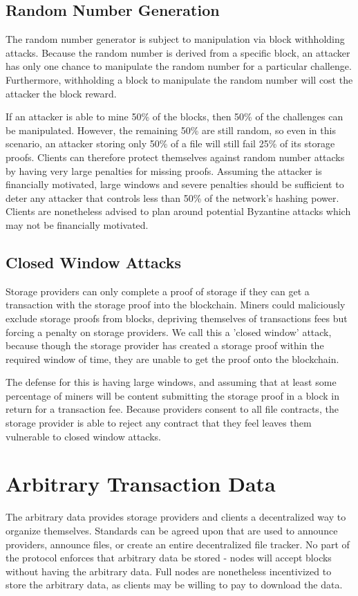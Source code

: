 \documentclass[twocolumn]{article}
\begin{document}
\subsection{Random Number Generation}
The random number generator is subject to manipulation via block withholding attacks.
Because the random number is derived from a specific block, an attacker has only one chance to manipulate the random number for a particular challenge.
Furthermore, withholding a block to manipulate the random number will cost the attacker the block reward.

If an attacker is able to mine 50\% of the blocks, then 50\% of the challenges can be manipulated.
However, the remaining 50\% are still random, so even in this scenario, an attacker storing only 50\% of a file will still fail 25\% of its storage proofs.
Clients can therefore protect themselves against random number attacks by having very large penalties for missing proofs.
Assuming the attacker is financially motivated, large windows and severe penalties should be sufficient to deter any attacker that controls less than 50\% of the network's hashing power.
Clients are nonetheless advised to plan around potential Byzantine attacks which may not be financially motivated.

\subsection{Closed Window Attacks}
Storage providers can only complete a proof of storage if they can get a transaction with the storage proof into the blockchain.
Miners could maliciously exclude storage proofs from blocks, depriving themselves of transactions fees but forcing a penalty on storage providers.
We call this a 'closed window' attack, because though the storage provider has created a storage proof within the required window of time, they are unable to get the proof onto the blockchain.

The defense for this is having large windows, and assuming that at least some percentage of miners will be content submitting the storage proof in a block in return for a transaction fee.
Because providers consent to all file contracts, the storage provider is able to reject any contract that they feel leaves them vulnerable to closed window attacks.

\section{Arbitrary Transaction Data}
The arbitrary data provides storage providers and clients a decentralized way to organize themselves.
Standards can be agreed upon that are used to announce providers, announce files, or create an entire decentralized file tracker.
No part of the protocol enforces that arbitrary data be stored - nodes will accept blocks without having the arbitrary data.
Full nodes are nonetheless incentivized to store the arbitrary data, as clients may be willing to pay to download the data.
\end{document}
